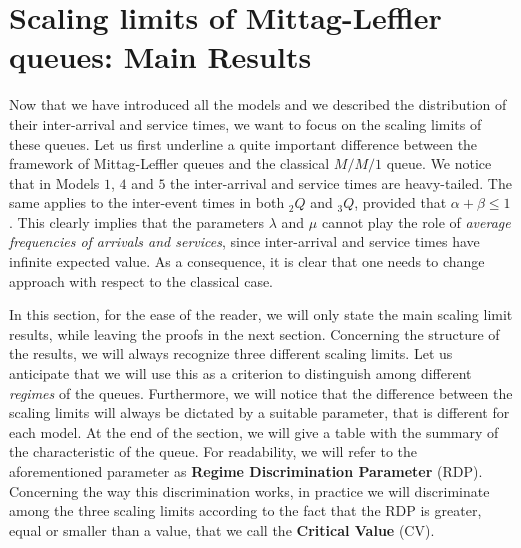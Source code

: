 \documentclass[]{amsart}
\numberwithin{equation}{section}
\theoremstyle{remark}
\theoremstyle{definition}
\begin{document}

\section{Scaling limits of Mittag-Leffler queues: Main Results}\label{sec:scaling}
Now that we have introduced all the models and we described the distribution of their inter-arrival and service times, we want to focus on the scaling limits of these queues. Let us first underline a quite important difference between the framework of Mittag-Leffler queues and the classical $M/M/1$ queue. We notice that in Models $1$, $4$ and $5$ the inter-arrival and service times are heavy-tailed. The same applies to the inter-event times in both ${}_2Q$ and ${}_3{Q}$, provided that $\alpha+\beta\le 1$. This clearly implies that the parameters $\lambda$ and $\mu$ cannot play the role of \textit{average frequencies of arrivals and services}, since inter-arrival and service times have infinite expected value. As a consequence, it is clear that one needs to change approach with respect to the classical case. 

{In this section, for the ease of the reader, we will only state the main scaling limit results, while leaving the proofs in the next section. Concerning the structure of the results, we will always recognize three different scaling limits. Let us anticipate that we will use this as a criterion to distinguish among different \textit{regimes} of the queues. Furthermore, we will notice that the difference between the scaling limits will always be dictated by a suitable parameter, that is different for each model. At the end of the section, we will give a table with the summary of the characteristic of the queue. For readability, we will refer to the aforementioned parameter as \textbf{Regime Discrimination Parameter} (RDP). Concerning the way this discrimination works, in practice we will discriminate among the three scaling limits according to the fact that the RDP is greater, equal or smaller than a value, that we call the \textbf{Critical Value} (CV).}
\end{document}
